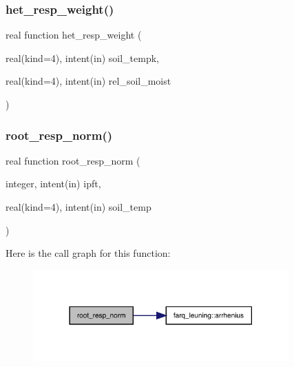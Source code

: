 \subsubsection{\texorpdfstring{het\+\_\+resp\+\_\+weight()}{het\_resp\_weight()}}
{\footnotesize\ttfamily real function het\+\_\+resp\+\_\+weight (\begin{DoxyParamCaption}\item[{real(kind=4), intent(in)}]{soil\+\_\+tempk,  }\item[{real(kind=4), intent(in)}]{rel\+\_\+soil\+\_\+moist }\end{DoxyParamCaption})}

\mbox{\label{soil__respiration_8f90_a6a8296433a336a5b1c3a83f3e5f54fe6}} 
\subsubsection{\texorpdfstring{root\+\_\+resp\+\_\+norm()}{root\_resp\_norm()}}
{\footnotesize\ttfamily real function root\+\_\+resp\+\_\+norm (\begin{DoxyParamCaption}\item[{integer, intent(in)}]{ipft,  }\item[{real(kind=4), intent(in)}]{soil\+\_\+temp }\end{DoxyParamCaption})}

Here is the call graph for this function\+:
\nopagebreak
\begin{figure}[H]
\begin{center}
\leavevmode
\includegraphics[width=278pt]{soil__respiration_8f90_a6a8296433a336a5b1c3a83f3e5f54fe6_cgraph}
\end{center}
\end{figure}
